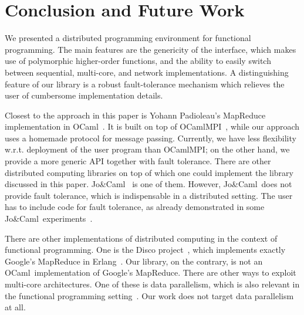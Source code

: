 \documentclass[a4paper,12pt]{article}
\newcommand{\Ocaml}{OCaml}
\newcommand{\JoCaml}{Jo{\&\!}Caml}
\begin{document}
\section{Conclusion and Future Work}\label{sec:future}

We presented a distributed programming environment for functional
programming. The main features are the genericity of the interface,
which makes use of polymorphic higher-order functions, and the ability
to easily switch between sequential, multi-core, and network
implementations. A distinguishing feature of our library is a
robust fault-tolerance mechanism which relieves
the user of cumbersome implementation details.

Closest to the approach in this paper is Yohann Padioleau's MapReduce
implementation in \Ocaml~\cite{poor-man-mapreduce}.  It is built on
top of OCamlMPI~\cite{ocamlMPI}, while our approach uses a homemade
protocol for message passing.  Currently, we have less flexibility
w.r.t. deployment of the user program than OCamlMPI; on the other
hand, we provide a 
more generic API together with fault tolerance.  There are other
distributed computing libraries on top of which one could implement
the library discussed in this paper. \JoCaml~\cite{jocaml} is one of
them. However, \JoCaml\ does not provide fault tolerance, which is
indispensable in a distributed setting. The user has to include code
for fault tolerance, as already demonstrated in some \JoCaml\
experiments~\cite{mandel2008}. 

There are other implementations of distributed computing in the
context of functional programming. One is the Disco
project~\cite{disco}, which implements exactly Google's MapReduce in
Erlang~\cite{erlang}. Our library, on the contrary, is not an \Ocaml\
implementation of Google's MapReduce.
There are other ways to exploit multi-core architectures. One of these
is data parallelism, which is also relevant in the functional
programming setting~\cite{parallel-haskell}. Our work
does not target data parallelism at all.
\end{document}
